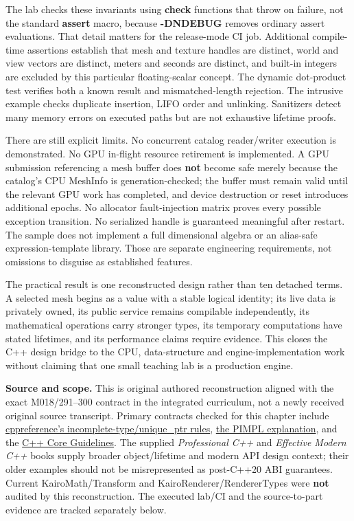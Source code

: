 The lab checks these invariants using \textbf{check} functions that throw on failure, not the standard \textbf{assert} macro, because \textbf{-DNDEBUG} removes ordinary assert evaluations. That detail matters for the release-mode CI job. Additional compile-time assertions establish that mesh and texture handles are distinct, world and view vectors are distinct, meters and seconds are distinct, and built-in integers are excluded by this particular floating-scalar concept. The dynamic dot-product test verifies both a known result and mismatched-length rejection. The intrusive example checks duplicate insertion, LIFO order and unlinking. Sanitizers detect many memory errors on executed paths but are not exhaustive lifetime proofs.

There are still explicit limits. No concurrent catalog reader/writer execution is demonstrated. No GPU in-flight resource retirement is implemented. A GPU submission referencing a mesh buffer does \textbf{not} become safe merely because the catalog's CPU MeshInfo is generation-checked; the buffer must remain valid until the relevant GPU work has completed, and device destruction or reset introduces additional epochs. No allocator fault-injection matrix proves every possible exception transition. No serialized handle is guaranteed meaningful after restart. The sample does not implement a full dimensional algebra or an alias-safe expression-template library. Those are separate engineering requirements, not omissions to disguise as established features.

The practical result is one reconstructed design rather than ten detached terms. A selected mesh begins as a value with a stable logical identity; its live data is privately owned, its public service remains compilable independently, its mathematical operations carry stronger types, its temporary computations have stated lifetimes, and its performance claims require evidence. This closes the C++ design bridge to the CPU, data-structure and engine-implementation work without claiming that one small teaching lab is a production engine.

\textbf{Source and scope.} This is original authored reconstruction aligned with the exact M018/291--300 contract in the integrated curriculum, not a newly received original source transcript. Primary contracts checked for this chapter include \href{https://en.cppreference.com/w/cpp/memory/unique_ptr}{cppreference's incomplete-type/unique\_ptr rules}, \href{https://en.cppreference.com/w/cpp/language/pimpl}{the PIMPL explanation}, and the \href{https://isocpp.github.io/CppCoreGuidelines/CppCoreGuidelines}{C++ Core Guidelines}. The supplied \emph{Professional C++} and \emph{Effective Modern C++} books supply broader object/lifetime and modern API design context; their older examples should not be misrepresented as post-C++20 ABI guarantees. Current KairoMath/Transform and KairoRenderer/RendererTypes were \textbf{not} audited by this reconstruction. The executed lab/CI and the source-to-part evidence are tracked separately below.

